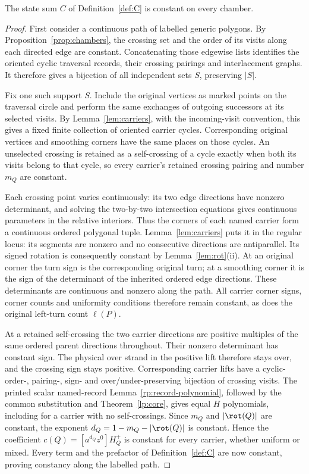 \begin{proposition}\label{prop:C-chamber}\leanok
The state sum $C$ of Definition~\ref{def:C} is constant on every chamber.

\end{proposition}
\begin{proof}\leanok{}
First consider a continuous path of labelled generic polygons. By
Proposition~\ref{prop:chambers}, the crossing set and the order of its
visits along each directed edge are constant. Concatenating those edgewise
lists identifies the oriented cyclic traversal records, their crossing
pairings and interlacement graphs. It therefore gives a bijection of all
independent sets $S$, preserving $|S|$.

Fix one such support $S$. Include the original vertices as marked points
on the traversal circle and perform the same exchanges of outgoing
successors at its selected visits. By Lemma~\ref{lem:carriers}, with the
incoming-visit convention, this gives a fixed finite collection of oriented
carrier cycles. Corresponding original vertices and smoothing corners
have the same places on those cycles. An unselected crossing is retained
as a self-crossing of a cycle exactly when both its visits belong to that
cycle, so every carrier's retained crossing pairing and number $m_Q$ are
constant.

Each crossing point varies continuously: its two edge directions have
nonzero determinant, and solving the two-by-two intersection equations
gives continuous parameters in the relative interiors. Thus the corners
of each named carrier form a continuous ordered polygonal tuple.
Lemma~\ref{lem:carriers} puts it in the regular locus: its segments are
nonzero and no consecutive directions are antiparallel. Its signed
rotation is consequently constant by Lemma~\ref{lem:rot}(ii).
At an original corner the turn sign is the corresponding original turn;
at a smoothing corner it is the sign of the determinant of the inherited
ordered edge directions. These determinants are continuous and nonzero
along the path. All carrier corner signs, corner counts and uniformity
conditions therefore remain constant, as does the original left-turn
count $\ell(P)$.

At a retained self-crossing the two carrier directions are positive
multiples of the same ordered parent directions throughout. Their
nonzero determinant has constant sign. The physical over strand in the
positive lift therefore stays over, and the crossing sign stays positive.
Corresponding carrier lifts have a cyclic-order-, pairing-, sign- and
over/under-preserving bijection of crossing visits. The printed
scalar named-record Lemma~\ref{rp:record-polynomial}, followed by the
common substitution and Theorem~\ref{lp:core}, gives equal $H$ polynomials,
including for a carrier with no self-crossings.
Since $m_Q$ and $|\rot(Q)|$ are constant, the exponent
$d_Q=1-m_Q-|\rot(Q)|$ is constant. Hence the coefficient
$c(Q)=[a^{d_Q}z^0]H_Q^+$ is constant for every carrier, whether uniform
or mixed. Every term and the prefactor of Definition~\ref{def:C} are
now constant, proving constancy along the labelled path.


\end{proof}
